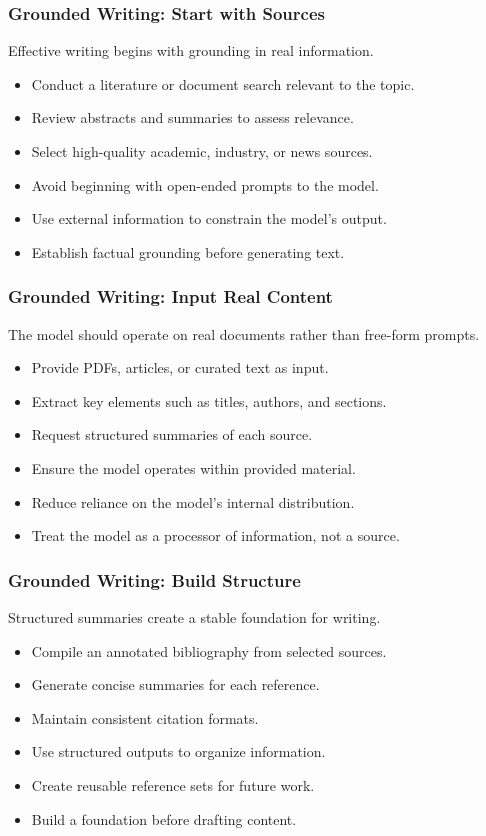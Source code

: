 \documentclass{beamer}
\begin{document}
\frame
{
   \frametitle{Grounded Writing: Start with Sources}

    Effective writing begins with grounding in real information.

    \begin{itemize}
        \item Conduct a literature or document search relevant to the topic.
        \item Review abstracts and summaries to assess relevance.
        \item Select high-quality academic, industry, or news sources.
        \item Avoid beginning with open-ended prompts to the model.
        \item Use external information to constrain the model’s output.
        \item Establish factual grounding before generating text.
    \end{itemize}
}

\frame
{
   \frametitle{Grounded Writing: Input Real Content}

    The model should operate on real documents rather than free-form prompts.

    \begin{itemize}
        \item Provide PDFs, articles, or curated text as input.
        \item Extract key elements such as titles, authors, and sections.
        \item Request structured summaries of each source.
        \item Ensure the model operates within provided material.
        \item Reduce reliance on the model’s internal distribution.
        \item Treat the model as a processor of information, not a source.
    \end{itemize}
}

\frame
{
   \frametitle{Grounded Writing: Build Structure}

    Structured summaries create a stable foundation for writing.

    \begin{itemize}
        \item Compile an annotated bibliography from selected sources.
        \item Generate concise summaries for each reference.
        \item Maintain consistent citation formats.
        \item Use structured outputs to organize information.
        \item Create reusable reference sets for future work.
        \item Build a foundation before drafting content.
    \end{itemize}
}
\end{document}
